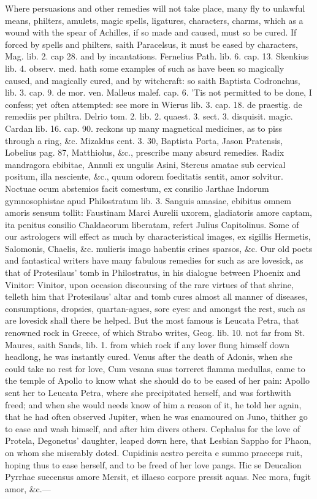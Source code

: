 {Where persuasions and other remedies will not take place, many fly to
unlawful means, philters, amulets, magic spells, ligatures, characters,
charms, which as a wound with the spear of Achilles, if so made and
caused, must so be cured. If forced by spells and philters, saith
Paracelsus, it must be eased by characters, Mag. lib. 2. cap 28. and by
incantations. Fernelius Path. lib. 6. cap. 13. Skenkius lib. 4.
observ. med. hath some examples of such as have been so magically
caused, and magically cured, and by witchcraft: so saith Baptista
Codronchus, lib. 3. cap. 9. de mor. ven. Malleus malef. cap. 6. 'Tis
not permitted to be done, I confess; yet often attempted: see more in
Wierus lib. 3. cap. 18. de praestig. de remediis per philtra. Delrio
tom. 2. lib. 2. quaest. 3. sect. 3. disquisit. magic. Cardan lib. 16.
cap. 90. reckons up many magnetical medicines, as to piss through a
ring, \&c. Mizaldus cent. 3. 30, Baptista Porta, Jason Pratensis,
Lobelius pag. 87, Matthiolus, \&c., prescribe many absurd remedies.
Radix mandragora ebibitae, Annuli ex ungulis Asini, Stercus amatae sub
cervical positum, illa nesciente, \&c., quum odorem foeditatis sentit,
amor solvitur. Noctuae ocum abstemios facit comestum, ex consilio
Jarthae Indorum gymnosophistae apud Philostratum lib. 3. Sanguis
amasiae, ebibitus omnem amoris sensum tollit: Faustinam Marci Aurelii
uxorem, gladiatoris amore captam, ita penitus consilio Chaldaeorum
liberatam, refert Julius Capitolinus. Some of our astrologers will
effect as much by characteristical images, ex sigillis Hermetis,
Salomonis, Chaelis, \&c. mulieris imago habentis crines sparsos, \&c. Our
old poets and fantastical writers have many fabulous remedies for such
as are lovesick, as that of Protesilaus' tomb in Philostratus, in his
dialogue between Phoenix and Vinitor: Vinitor, upon occasion
discoursing of the rare virtues of that shrine, telleth him that
Protesilaus' altar and tomb cures almost all manner of diseases,
consumptions, dropsies, quartan-agues, sore eyes: and amongst the rest,
such as are lovesick shall there be helped. But the most famous is
Leucata Petra, that renowned rock in Greece, of which Strabo
writes, Geog. lib. 10. not far from St. Maures, saith Sands, lib. 1.
from which rock if any lover flung himself down headlong, he was
instantly cured. Venus after the death of Adonis, when she could take
no rest for love, Cum vesana suas torreret flamma medullas, came
to the temple of Apollo to know what she should do to be eased of her
pain: Apollo sent her to Leucata Petra, where she precipitated herself,
and was forthwith freed; and when she would needs know of him a reason
of it, he told her again, that he had often observed Jupiter,
when he was enamoured on Juno, thither go to ease and wash himself, and
after him divers others. Cephalus for the love of Protela, Degonetus'
daughter, leaped down here, that Lesbian Sappho for Phaon, on whom she
miserably doted. Cupidinis aestro percita e summo praeceps ruit,
hoping thus to ease herself, and to be freed of her love pangs.
Hic se Deucalion Pyrrhae suecensus amore
Mersit, et illaeso corpore pressit aquas.
Nec mora, fugit amor, \&c.---

}
